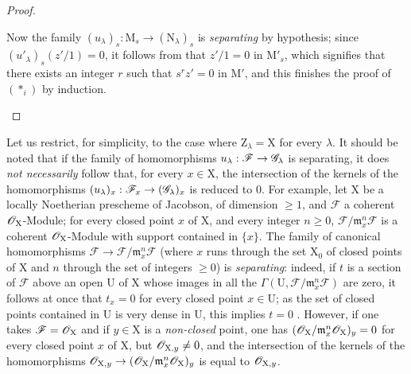 \begin{proof}
\begin{enumerate}[label=(\roman*)]
  Now the family $(u_\lambda)_s:\mathrm{M}_s\to(\mathrm{N}_\lambda)_s$ is \emph{separating} by hypothesis; since $(u'_\lambda)_s(z'/1)=0$, it follows from  that $z'/1=0$ in $\mathrm{M}'_s$, which signifies that there exists an integer $r$ such that $s^r z'=0$ in $\mathrm{M}'$, and this finishes the proof of $(*_i)$ by induction.
\end{enumerate}
\end{proof}

\begin{remark}[11.9.11]
\label{IV.11.9.11}
Let us restrict, for simplicity, to the case where $\mathrm{Z}_\lambda=\mathrm{X}$ for every $\lambda$.
It should be noted that if the family of homomorphisms $u_\lambda:\mathscr{F}\to\mathscr{G}_\lambda$ is separating, it does \emph{not necessarily} follow that, for every $x\in\mathrm{X}$, the intersection of the kernels of the homomorphisms $(u_\lambda)_x:\mathscr{F}_x\to(\mathscr{G}_\lambda)_x$ is reduced to $0$.
For example, let $\mathrm{X}$ be a locally Noetherian prescheme of Jacobson, of dimension $\geq 1$, and $\mathscr{F}$ a coherent $\mathscr{O}_\mathrm{X}$-Module; for every closed point $x$ of $\mathrm{X}$, and every integer $n\geq 0$, $\mathscr{F}/\mathfrak{m}_x^n\mathscr{F}$ is a coherent $\mathscr{O}_\mathrm{X}$-Module with support contained in $\{x\}$.
The family of canonical homomorphisms $\mathscr{F}\to\mathscr{F}/\mathfrak{m}_x^n\mathscr{F}$ (where $x$ runs through the set $\mathrm{X}_0$ of closed points of $\mathrm{X}$ and $n$ through the set of integers $\geq 0$) is \emph{separating}: indeed, if $t$ is a section of $\mathscr{F}$ above an open $\mathrm{U}$ of $\mathrm{X}$ whose images in all the $\Gamma(\mathrm{U},\mathscr{F}/\mathfrak{m}_x^n\mathscr{F})$ are zero, it follows at once that $t_x=0$ for every closed point $x\in\mathrm{U}$; as the set of closed points contained in $\mathrm{U}$ is very dense in $\mathrm{U}$, this implies $t=0$ .
However, if one takes $\mathscr{F}=\mathscr{O}_\mathrm{X}$ and if $y\in\mathrm{X}$ is a \emph{non-closed} point, one has $(\mathscr{O}_\mathrm{X}/\mathfrak{m}_x^n\mathscr{O}_\mathrm{X})_y=0$ for every closed point $x$ of $\mathrm{X}$, but $\mathscr{O}_{\mathrm{X},y}\neq 0$, and the intersection of the kernels of the homomorphisms $\mathscr{O}_{\mathrm{X},y}\to(\mathscr{O}_\mathrm{X}/\mathfrak{m}_x^n\mathscr{O}_\mathrm{X})_y$ is equal to $\mathscr{O}_{\mathrm{X},y}$.
\end{remark}

